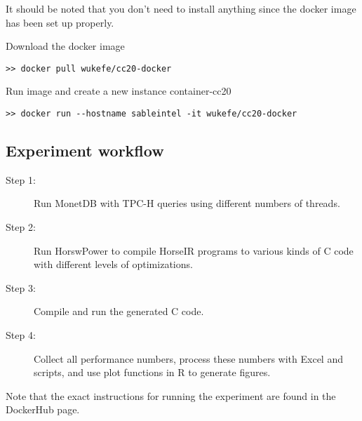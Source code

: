 {It should be noted that you don't need to install anything since the docker image
has been set up properly.

Download the docker image

\begin{verbatim}
>> docker pull wukefe/cc20-docker
\end{verbatim}

Run image and create a new instance container-cc20

\begin{verbatim}
>> docker run --hostname sableintel -it wukefe/cc20-docker
\end{verbatim}

% 
% 
% 
% 
% 

\subsection{Experiment workflow}

\begin{description}
\item[Step 1:] Run MonetDB with TPC-H queries using different numbers of threads.
\item[Step 2:] Run HorswPower to compile HorseIR programs to various kinds of C code with different levels of optimizations.
\item[Step 3:] Compile and run the generated C code.
\item[Step 4:] Collect all performance numbers, process these numbers with Excel and scripts, and use plot functions in R to generate figures.
\end{description}

\noindent Note that the exact instructions for running the experiment are found in the DockerHub page.

}
